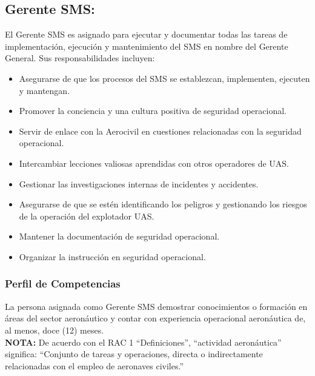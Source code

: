 \subsection{Gerente SMS:} El Gerente SMS es asignado para ejecutar y documentar todas las tareas de implementación, ejecución y mantenimiento del SMS en nombre del Gerente General. Sus responsabilidades incluyen:

\begin{itemize}
    \item Asegurarse de que los procesos del SMS se establezcan, implementen, ejecuten y mantengan.
    \item Promover la conciencia y una cultura positiva de seguridad operacional.
    \item Servir de enlace con la Aerocivil en cuestiones relacionadas con la seguridad operacional.
    \item Intercambiar lecciones valiosas aprendidas con otros operadores de UAS.
    \item Gestionar las investigaciones internas de incidentes y accidentes.
    \item Asegurarse de que se estén identificando los peligros y gestionando los riesgos de la operación del explotador UAS.
    \item Mantener la documentación de seguridad operacional.
    \item Organizar la instrucción en seguridad operacional.
\end{itemize}

\subsubsection{Perfil de Competencias}
La persona asignada como Gerente SMS demostrar conocimientos o formación en áreas del sector aeronáutico y contar con experiencia operacional aeronáutica de, al menos, doce (12) meses.\\

\textbf{NOTA:} De acuerdo con el RAC 1 “Definiciones”, “actividad aeronáutica” significa: “Conjunto de tareas y operaciones, directa o indirectamente relacionadas con el empleo de aeronaves civiles.”

